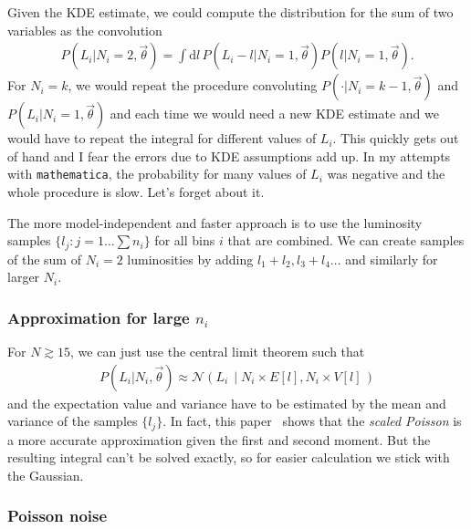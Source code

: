 \documentclass[a4,12pt]{article}
\newcommand{\given}[2]{\left(#1\, \middle| #2 \, \right)}
\newcommand{\gaussian}{\ensuremath{\mathcal{N}}}
\newcommand{\Lumi}{\ensuremath{L_i}}
\newcommand{\rmdx}[1]{\mbox{d} #1 \,} %
\newcommand{\vecth}{\ensuremath{{\vec{\theta}}}}
\begin{document}
Given the KDE estimate, we could compute the distribution for the sum
of two variables as the convolution
\begin{align}
  \label{eq:sum-of-2}
  P(\Lumi | N_i=2, \vecth) = \int \rmdx{l} P(\Lumi -l | N_i=1, \vecth) P(l | N_i=1, \vecth).
\end{align}
For $N_i =k$, we would repeat the procedure convoluting $P(\cdot |
N_i=k-1, \vecth)$ and $P(\Lumi | N_i=1, \vecth)$ and each time we
would need a new KDE estimate and we would have to repeat the integral
for different values of $\Lumi$. This quickly gets out of hand and I
fear the errors due to KDE assumptions add up. In my attempts with
\texttt{mathematica}, the probability for many values of $\Lumi$ was
negative and the whole procedure is slow. Let's forget about it.

The more model-independent and faster approach is to use the
luminosity samples $\{l_j: j=1 \dots \sum n_i\}$ for all bins $i$ that
are combined. We can create samples of the sum of $N_i=2$ luminosities
by adding $l_1+l_2, l_3 + l_4 \dots$ and similarly for larger
$N_i$.

\subsubsection*{Approximation for large $n_i$}

For $N \gtrsim 15$, we can just use the central limit theorem
such that
\begin{align}
  \label{eq:clt}
  P(\Lumi | N_i, \vecth) \approx \gaussian \given{\Lumi}{N_i \times E[l], N_i \times V[l]}
\end{align}
and the expectation value and variance have to be estimated by the mean
and variance of the samples $\{l_j\}$. In fact, this paper~\cite{bohm_statistics_2014}
shows that the \emph{scaled Poisson} is a more accurate approximation
given the first and second moment. But the resulting integral can't be
solved exactly, so for easier calculation we stick with the Gaussian.

\subsubsection{Poisson noise}
\end{document}
